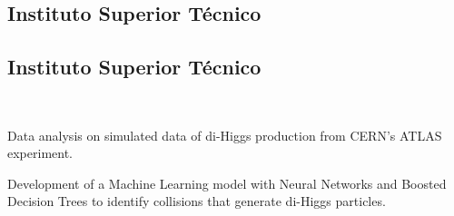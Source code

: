 \documentclass[a4paper]{MagicalCV}
\begin{document}
\hfill
\begin{minipage}[t]{0.66\textwidth} 


\subsection{Instituto Superior Técnico}
\vspace{\topsep} %
\sectionsep

\subsection{Instituto Superior Técnico}
\sectionsep


 \\
\vspace{\topsep} %
\begin{tightemize}
    \item Data analysis on simulated data of di-Higgs production from CERN's ATLAS experiment.
    \item Development of a Machine Learning model with Neural Networks and Boosted Decision Trees to identify collisions that generate di-Higgs particles.
\end{tightemize}
\sectionsep


\end{minipage}
\end{document}
